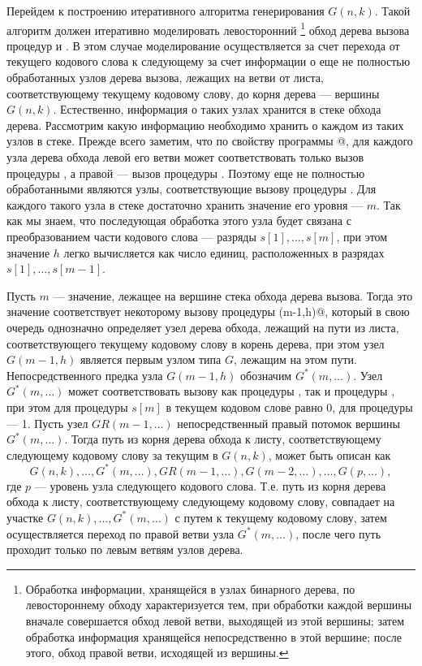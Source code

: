\documentclass[12pt,a4paper]{article}
\theoremstyle{plain}
\theoremstyle{definition}
\theoremstyle{remark}
\begin{document}
Перейдем к построению итеративного алгоритма генерирования $G(n,k)$. Такой алгоритм должен итеративно моделировать левосторонний
\footnote{Обработка информации, хранящейся в узлах бинарного дерева, по левостороннему обходу характеризуется тем, при обработки каждой вершины вначале совершается обход левой ветви, выходящей из этой вершины; затем обработка информация хранящейся непосредственно в этой вершине; после этого, обход правой ветви, исходящей из вершины.}
обход дерева вызова процедур \verb@G@ и \verb@GR@. В этом случае моделирование осуществляется за счет перехода от текущего кодового слова к следующему за счет информации о еще не полностью обработанных узлов дерева вызова, лежащих на ветви от листа, соответствующему текущему кодовому слову, до корня дерева --- вершины $G(n,k)$. Естественно, информация о таких узлах хранится в стеке обхода дерева. Рассмотрим какую информацию необходимо хранить о каждом из таких узлов в стеке. Прежде всего заметим, что по свойству программы @, для каждого узла дерева обхода левой его ветви может соответствовать только вызов процедуры \verb@G@, а правой --- вызов процедуры \verb@GR@. Поэтому еще не полностью обработанными являются узлы, соответствующие вызову процедуры \verb@G@. Для каждого такого узла в стеке достаточно хранить значение его уровня --- $m$. Так как мы знаем, что последующая обработка этого узла будет связана с преобразованием части кодового слова --- разряды $s[1],\ldots,s[m]$, при этом значение $h$ легко вычисляется как число единиц, расположенных в разрядах $s[1],\ldots,s[m-1]$.

Пусть $m$ --- значение, лежащее на вершине стека обхода дерева вызова. Тогда это значение соответствует некоторому вызову процедуры \verb@G(m-1,h)@, который в свою очередь однозначно определяет узел дерева обхода, лежащий на пути из листа, соответствующего текущему кодовому слову в корень дерева, при этом узел $G(m-1,h)$ является первым узлом типа $G$, лежащим на этом пути. Непосредственного предка узла $G(m-1,h)$ обозначим $G^*(m,\ldots)$. Узел $G^*(m,\ldots)$ может соответствовать вызову как процедуры \verb@G@, так и процедуры \verb@GR@, при этом для процедуры \verb@G@ $s[m]$ в текущем кодовом слове равно 0, для процедуры \verb@GR@ --- 1. Пусть узел $GR(m-1,\ldots)$ непосредственный правый потомок вершины $G^*(m,\ldots)$. Тогда путь из корня дерева обхода к листу, соответствующему следующему кодовому слову за текущим в $G(n,k)$, может быть описан как
\[ G(n,k),\ldots,G^*(m,\ldots), GR(m-1,\ldots), G(m-2,\ldots),\ldots,G(p,\ldots),\]
где $p$ --- уровень узла следующего кодового слова. Т.е. путь из корня дерева обхода к листу, соответствующему следующему кодовому слову, совпадает на участке $G(n,k),\ldots, G^*(m,\ldots)$ с путем к текущему кодовому слову, затем осуществляется переход по правой ветви узла $G^*(m,\ldots)$, после чего путь проходит только по левым ветвям узлов дерева.
\end{document}
